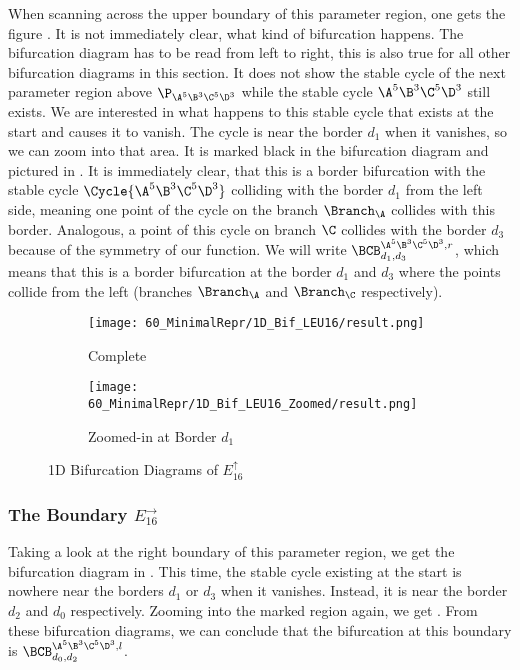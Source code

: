 When scanning across the upper boundary of this parameter region, one gets the figure .
It is not immediately clear, what kind of bifurcation happens.
The bifurcation diagram has to be read from left to right, this is also true for all other bifurcation diagrams in this section.
It does not show the stable cycle of the next parameter region above $\P_{\A^5\B^3\C^5\D^3}$ while the stable cycle $\A^5\B^3\C^5\D^3$ still exists.
We are interested in what happens to this stable cycle that exists at the start and causes it to vanish.
The cycle is near the border $d_1$ when it vanishes, so we can zoom into that area.
It is marked black in the bifurcation diagram and pictured in .
It is immediately clear, that this is a border bifurcation with the stable cycle $\Cycle{\A^5\B^3\C^5\D^3}$ colliding with the border $d_1$ from the left side, meaning one point of the cycle on the branch $\Branch_\A$ collides with this border.
Analogous, a point of this cycle on branch $\C$ collides with the border $d_3$ because of the symmetry of our function.
We will write $\BCB_{d_1, d_3}^{\A^5\B^3\C^5\D^3, r}$, which means that this is a border bifurcation at the border $d_1$ and $d_3$ where the points collide from the left (branches $\Branch_\A$ and $\Branch_\C$ respectively).

\begin{figure}
    \centering
    \begin{subfigure}{0.4\textwidth}
        \centering
        \texttt{[image: 60\_MinimalRepr/1D\_Bif\_LEU16/result.png]}
        \caption{Complete}
        \label{fig:final.bifurcation.E.up}
    \end{subfigure}
    \begin{subfigure}{0.4\textwidth}
        \centering
        \texttt{[image: 60\_MinimalRepr/1D\_Bif\_LEU16\_Zoomed/result.png]}
        \caption{Zoomed-in at Border $d_1$}
        \label{fig:bifurcation.E.up.zoomed}
    \end{subfigure}
    \caption{1D Bifurcation Diagrams of $E_{16}^\uparrow$}
\end{figure}

\subsubsection{The Boundary $E_{16}^\rightarrow$}

Taking a look at the right boundary of this parameter region, we get the bifurcation diagram in .
This time, the stable cycle existing at the start is nowhere near the borders $d_1$ or $d_3$ when it vanishes.
Instead, it is near the border $d_2$ and $d_0$ respectively.
Zooming into the marked region again, we get .
From these bifurcation diagrams, we can conclude that the bifurcation at this boundary is $\BCB_{d_0, d_2}^{\A^5\B^3\C^5\D^3, l}$.

